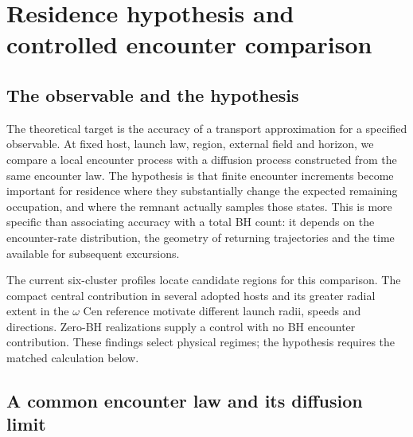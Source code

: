 \documentclass[aps,prd,reprint,amsmath,amssymb,superscriptaddress,nofootinbib,longbibliography,floatfix]{revtex4-2}
\begin{document}
\section{Residence hypothesis and controlled encounter comparison}\label{sec:hypothesis}

\subsection{The observable and the hypothesis}

The theoretical target is the accuracy of a transport approximation for a specified observable. At fixed host, launch law, region, external field and horizon, we compare a local encounter process with a diffusion process constructed from the same encounter law. The hypothesis is that finite encounter increments become important for residence where they substantially change the expected remaining occupation, and where the remnant actually samples those states. This is more specific than associating accuracy with a total BH count: it depends on the encounter-rate distribution, the geometry of returning trajectories and the time available for subsequent excursions.

The current six-cluster profiles locate candidate regions for this comparison. The compact central contribution in several adopted hosts and its greater radial extent in the $\omega$ Cen reference motivate different launch radii, speeds and directions. Zero-BH realizations supply a control with no BH encounter contribution. These findings select physical regimes; the hypothesis requires the matched calculation below.

\subsection{A common encounter law and its diffusion limit}
\end{document}
